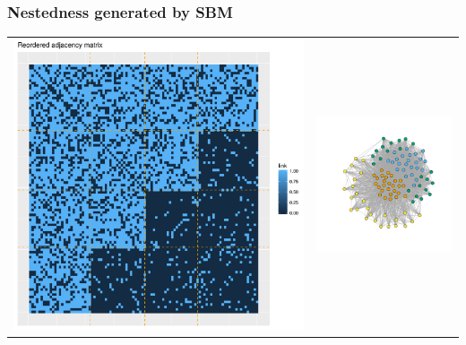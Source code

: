 \documentclass[compress,10pt]{beamer}
\begin{document}
\begin{frame}
\frametitle{Nestedness  generated by SBM}

\centering
\begin{tabular}{cc}
 \includegraphics[scale=.2]{plots/sbm/Nested_reordered_adja_with_groups.png}&
\includegraphics[scale=.2]{plots/sbm/Nested_graphe_with_colors.png} 
 \end{tabular}


\end{frame}
\end{document}

